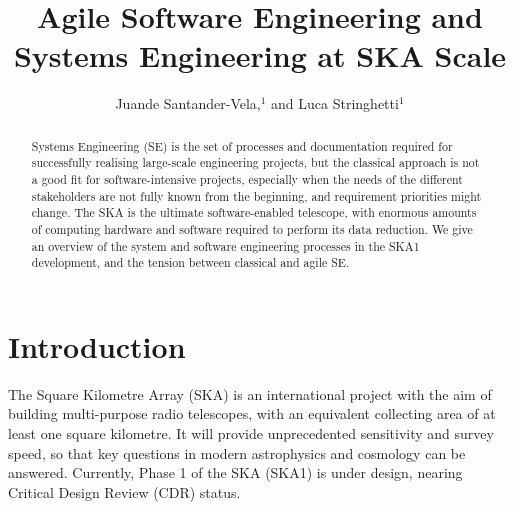 \documentclass[11pt,twoside]{article}
\begin{document}
\title{Agile Software Engineering and Systems Engineering at SKA Scale}

\author{Juande Santander-Vela,$^1$ and Luca Stringhetti$^1$
}


\begin{abstract}
Systems Engineering (SE) is the set of processes and documentation required for successfully realising large-scale engineering projects, but the classical approach is not a good fit for software-intensive projects, especially when the needs of the different stakeholders are not fully known from the beginning, and requirement priorities might change. The SKA is the ultimate software-enabled telescope, with enormous amounts of computing hardware and software required to perform its data reduction. We give an overview of the system and software engineering processes in the SKA1 development, and the tension between classical and agile SE.
\end{abstract}


\section{Introduction} %
\label{sec:introduction}
The Square Kilometre Array (SKA) is an international project with the aim of building multi-purpose radio telescopes, with an equivalent collecting area of at least one square kilometre. It will provide unprecedented sensitivity and survey speed, so that key questions in modern astrophysics and cosmology can be answered. Currently, Phase 1 of the SKA (SKA1) is under design, nearing Critical Design Review (CDR) status.	
	
\end{document}

